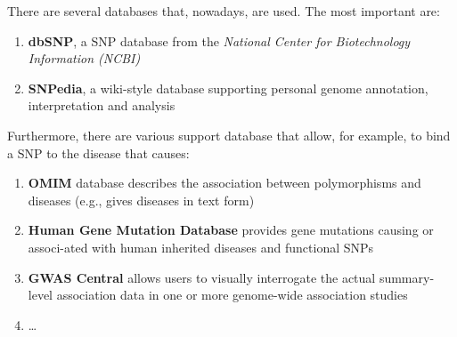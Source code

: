 \newpage

There are several databases that, nowadays, are used. The most important are:

\begin{enumerate}
	\item \textbf{dbSNP}, a SNP database from the \emph{National Center for Biotechnology Information (NCBI)}
	\item \textbf{SNPedia}, a wiki-style database supporting personal genome annotation, interpretation and analysis
	\end{enumerate}

Furthermore, there are various support database that allow, for example, to bind a SNP to the disease that causes:

\begin{enumerate}
	\item \textbf{OMIM} database describes the association between polymorphisms and diseases (e.g., gives diseases in text form)
	\item \textbf{Human Gene Mutation Database} provides gene mutations causing or associ-ated with human inherited diseases and functional SNPs
	\item \textbf{GWAS Central} allows users to visually interrogate the actual summary-level association data in one or more genome-wide association studies
	\item \ldots
	\end{enumerate}